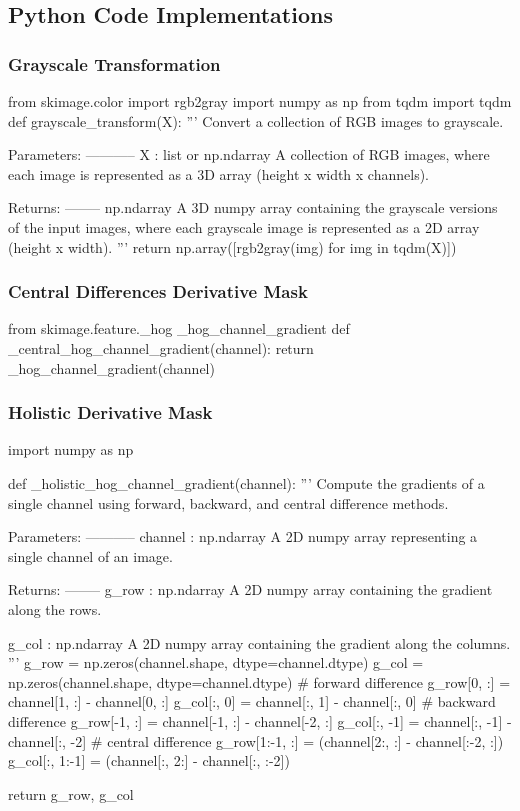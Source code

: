 \subsection{Python Code Implementations}
\subsubsection{Grayscale Transformation}\label{appendix:grayscale}
\begin{pythoncode}
from skimage.color import rgb2gray
import numpy as np
from tqdm import tqdm
def grayscale_transform(X):
    '''
    Convert a collection of RGB images to grayscale.

    Parameters:
    -----------
    X : list or np.ndarray
        A collection of RGB images, where each image is represented as a 3D array (height x width x channels).

    Returns:
    --------
    np.ndarray
        A 3D numpy array containing the grayscale versions of the input images, 
        where each grayscale image is represented as a 2D array (height x width).
    '''
    return np.array([rgb2gray(img) for img in tqdm(X)])
\end{pythoncode}
\subsubsection{Central Differences Derivative Mask}
\begin{pythoncode}
from skimage.feature._hog _hog_channel_gradient
def _central_hog_channel_gradient(channel):
    return _hog_channel_gradient(channel)
\end{pythoncode}

\subsubsection{Holistic Derivative Mask}\label{appendix:holistic_der_mask}
\begin{pythoncode}
import numpy as np

def _holistic_hog_channel_gradient(channel):
    '''
    Compute the gradients of a single channel using forward, backward, and central difference methods.

    Parameters:
    -----------
    channel : np.ndarray
        A 2D numpy array representing a single channel of an image.

    Returns:
    --------
    g_row : np.ndarray
        A 2D numpy array containing the gradient along the rows.
    
    g_col : np.ndarray
        A 2D numpy array containing the gradient along the columns.
    '''
    g_row = np.zeros(channel.shape, dtype=channel.dtype)
    g_col = np.zeros(channel.shape, dtype=channel.dtype)
    # forward difference
    g_row[0, :] = channel[1, :] - channel[0, :]
    g_col[:, 0] = channel[:, 1] - channel[:, 0]
    # backward difference
    g_row[-1, :] = channel[-1, :] - channel[-2, :]
    g_col[:, -1] = channel[:, -1] - channel[:, -2]
    # central difference
    g_row[1:-1, :] = (channel[2:, :] - channel[:-2, :])
    g_col[:, 1:-1] = (channel[:, 2:] - channel[:, :-2])

    return g_row, g_col
\end{pythoncode}
